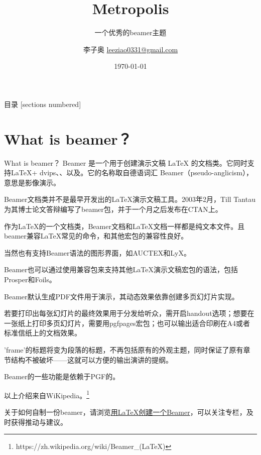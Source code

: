 \documentclass[9pt,UTF8]{ctexbeamer}
\title{Metropolis} %
\subtitle{一个优秀的beamer主题} %
\date{\today} %
\author{李子奥 \hspace{2em} \href{mailto: leeziao0331@gmail.com}{leeziao0331@gmail.com}} %
\institute{华中科技大学 \hspace{4em} 人工智能与自动化学院} %
\begin{document}
\maketitle %

\begin{frame}{目录}
  [sections numbered]
  \tableofcontents%
\end{frame}

\section{What is beamer？}
\begin{frame}[allowframebreaks]{What is beamer？}
	Beamer 是一个用于创建演示文稿 LaTeX 的文档类。它同时支持\LaTeX + dvips、、以及。它的名称取自德语词汇 Beamer（pseudo-anglicism），意思是影像演示。
	
	Beamer文档类并不是最早开发出的\LaTeX 演示文稿工具。2003年2月，Till Tantau为其博士论文答辩编写了beamer包，并于一个月之后发布在CTAN上。
	
	作为LaTeX的一个文档类，Beamer文档和\LaTeX 文档一样都是纯文本文件。且beamer兼容\LaTeX 常见的命令，和其他宏包的兼容性良好。
	
	当然也有支持Beamer语法的图形界面，如AUCTEX和LyX。
	
	Beamer也可以通过使用兼容包来支持其他LaTeX演示文稿宏包的语法，包括 Prosper和Foils。
	
	Beamer默认生成PDF文件用于演示，其动态效果依靠创建多页幻灯片实现。
	
	若要打印出每张幻灯片的最终效果用于分发给听众，需开启handout选项；想要在一张纸上打印多页幻灯片，需要用pgfpages宏包；也可以输出适合印刷在A4或者标准信纸上的文档效果。
	
	'frame'的标题将变为段落的标题，不再包括原有的外观主题，同时保证了原有章节结构不被破坏——这就可以方便的输出演讲的提纲。
	
	Beamer的一些功能是依赖于PGF的。
	
	以上介绍来自WiKipedia。\footnote{https://zh.wikipedia.org/wiki/Beamer\_(LaTeX)}
	
	关于如何自制一份beamer，请浏览\href{https://zhuanlan.zhihu.com/p/423443762}{用LaTeX创建一个Beamer}，可以关注专栏，及时获得推动与建议。
\end{frame}
\end{document}
